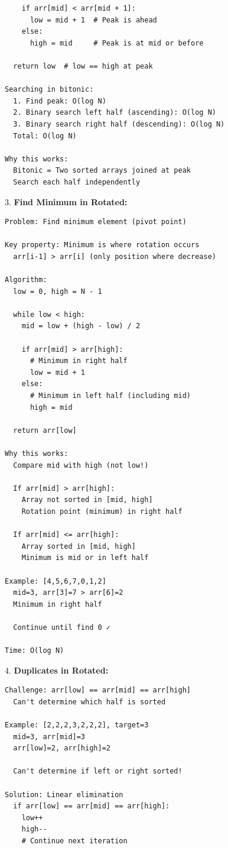 \documentclass[11pt,a4paper,oneside]{book}
\begin{document}
\begin{tcolorbox}[
    enhanced,breakable,
    colback=white,
    colframe=deepblue,
    boxrule=1.5pt,
    arc=3mm,
    title=\textbf{Beyond Simple Sorted Arrays}
]
\begin{verbatim}
    if arr[mid] < arr[mid + 1]:
      low = mid + 1  # Peak is ahead
    else:
      high = mid     # Peak is at mid or before

  return low  # low == high at peak

Searching in bitonic:
  1. Find peak: O(log N)
  2. Binary search left half (ascending): O(log N)
  3. Binary search right half (descending): O(log N)
  Total: O(log N)

Why this works:
  Bitonic = Two sorted arrays joined at peak
  Search each half independently
\end{verbatim}

3. \textbf{Find Minimum in Rotated:}
\begin{verbatim}
Problem: Find minimum element (pivot point)

Key property: Minimum is where rotation occurs
  arr[i-1] > arr[i] (only position where decrease)

Algorithm:
  low = 0, high = N - 1
  
  while low < high:
    mid = low + (high - low) / 2
    
    if arr[mid] > arr[high]:
      # Minimum in right half
      low = mid + 1
    else:
      # Minimum in left half (including mid)
      high = mid
  
  return arr[low]

Why this works:
  Compare mid with high (not low!)
  
  If arr[mid] > arr[high]:
    Array not sorted in [mid, high]
    Rotation point (minimum) in right half
  
  If arr[mid] <= arr[high]:
    Array sorted in [mid, high]
    Minimum is mid or in left half

Example: [4,5,6,7,0,1,2]
  mid=3, arr[3]=7 > arr[6]=2
  Minimum in right half
  
  Continue until find 0 ✓

Time: O(log N)
\end{verbatim}

4. \textbf{Duplicates in Rotated:}
\begin{verbatim}
Challenge: arr[low] == arr[mid] == arr[high]
  Can't determine which half is sorted
  
Example: [2,2,2,3,2,2,2], target=3
  mid=3, arr[mid]=3
  arr[low]=2, arr[high]=2
  
  Can't determine if left or right sorted!

Solution: Linear elimination
  if arr[low] == arr[mid] == arr[high]:
    low++
    high--
    # Continue next iteration
  

\end{verbatim}
\end{tcolorbox}
\end{document}
